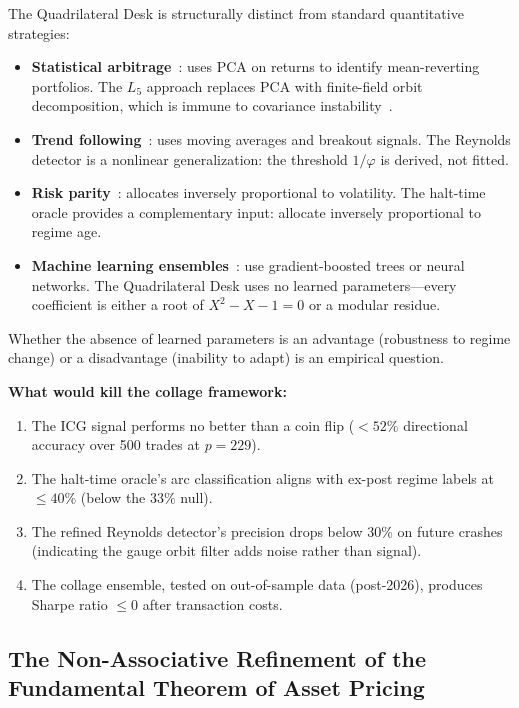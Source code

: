 \begin{remark}
The Quadrilateral Desk is structurally distinct from standard quantitative strategies:
\begin{itemize}[noitemsep]
\item \textbf{Statistical arbitrage}~\cite{avellaneda_lee2010}: uses PCA on returns to identify mean-reverting portfolios. The $L_5$ approach replaces PCA with finite-field orbit decomposition, which is immune to covariance instability~\cite{embrechts2002}.
\item \textbf{Trend following}~\cite{hurst_ooi_pedersen2017}: uses moving averages and breakout signals. The Reynolds detector is a nonlinear generalization: the threshold $1/\varphi$ is derived, not fitted.
\item \textbf{Risk parity}~\cite{qian2005}: allocates inversely proportional to volatility. The halt-time oracle provides a complementary input: allocate inversely proportional to regime age.
\item \textbf{Machine learning ensembles}~\cite{lopezdeprado2018}: use gradient-boosted trees or neural networks. The Quadrilateral Desk uses no learned parameters---every coefficient is either a root of $X^2 - X - 1 = 0$ or a modular residue.
\end{itemize}
Whether the absence of learned parameters is an advantage (robustness to regime change) or a disadvantage (inability to adapt) is an empirical question.
\end{remark}

\textbf{What would kill the collage framework:}
\begin{enumerate}[noitemsep]
\item The ICG signal performs no better than a coin flip ($< 52\%$ directional accuracy over 500 trades at $p = 229$).
\item The halt-time oracle's arc classification aligns with ex-post regime labels at $\leq 40\%$ (below the $33\%$ null).
\item The refined Reynolds detector's precision drops below 30\% on future crashes (indicating the gauge orbit filter adds noise rather than signal).
\item The collage ensemble, tested on out-of-sample data (post-2026), produces Sharpe ratio $\leq 0$ after transaction costs.
\end{enumerate}

\subsection{The Non-Associative Refinement of the Fundamental Theorem of Asset Pricing}

